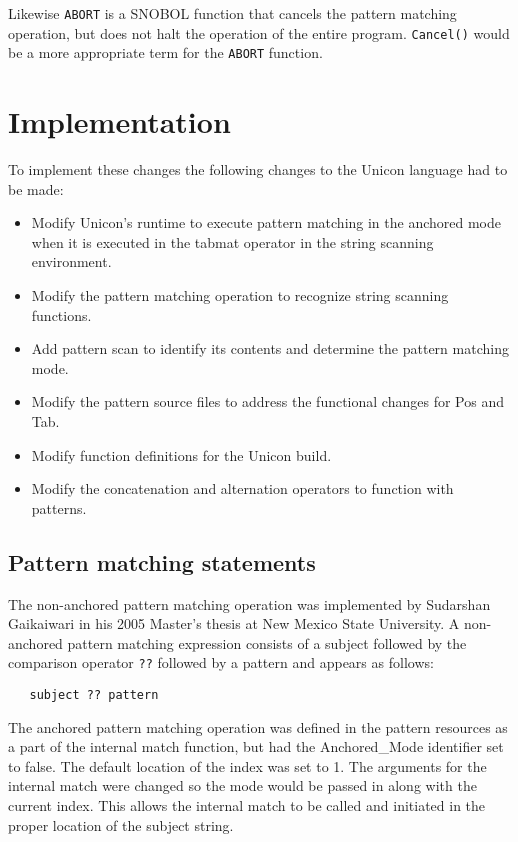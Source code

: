 \documentclass{article}
\begin{document}
Likewise \texttt{ABORT} is a SNOBOL function that cancels the pattern matching operation, but does not halt the operation of the entire program.  \texttt{Cancel()} would be a more appropriate term for the \texttt{ABORT} function. 

\section{Implementation}
To implement these changes the following changes to the Unicon language had to be made:
\begin{itemize}
\item Modify Unicon's runtime to execute pattern matching in the anchored mode when it is executed in the tabmat operator in the string scanning environment.
\item Modify the pattern matching operation to recognize string scanning functions.
\item Add pattern scan to identify its contents and determine the pattern matching mode.
\item Modify the pattern source files to address the functional changes for Pos and Tab.
\item Modify function definitions for the Unicon build.
\item Modify the concatenation and alternation operators to function with patterns.
\end{itemize}

\subsection{Pattern matching statements}
The non-anchored pattern matching operation was implemented by Sudarshan Gaikaiwari in his 2005 Master's thesis at New Mexico State University.  A non-anchored pattern matching expression consists of a subject followed by the comparison operator \texttt{??} followed by a pattern and appears as follows:

\begin{verbatim}
   subject ?? pattern
\end{verbatim}

The anchored pattern matching operation was defined in the pattern resources as a part of the internal match function, but had the Anchored\_Mode identifier set to false.  The default location of the index was set to 1.  The arguments for the internal match were changed so the mode would be passed in along with the current index.  This allows the internal match to be called and initiated in the proper location of the subject string.
\end{document}
